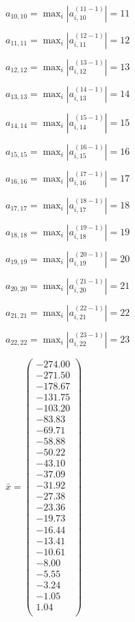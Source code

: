\documentclass[a4paper,12pt]{article}
\begin{document}
$a _{ 10, 10 } =  \max _i |a _{ i, 10 } ^{ (11 - 1) } | = 11$

$a _{ 11, 11 } =  \max _i |a _{ i, 11 } ^{ (12 - 1) } | = 12$

$a _{ 12, 12 } =  \max _i |a _{ i, 12 } ^{ (13 - 1) } | = 13$

$a _{ 13, 13 } =  \max _i |a _{ i, 13 } ^{ (14 - 1) } | = 14$

$a _{ 14, 14 } =  \max _i |a _{ i, 14 } ^{ (15 - 1) } | = 15$

$a _{ 15, 15 } =  \max _i |a _{ i, 15 } ^{ (16 - 1) } | = 16$

$a _{ 16, 16 } =  \max _i |a _{ i, 16 } ^{ (17 - 1) } | = 17$

$a _{ 17, 17 } =  \max _i |a _{ i, 17 } ^{ (18 - 1) } | = 18$

$a _{ 18, 18 } =  \max _i |a _{ i, 18 } ^{ (19 - 1) } | = 19$

$a _{ 19, 19 } =  \max _i |a _{ i, 19 } ^{ (20 - 1) } | = 20$

$a _{ 20, 20 } =  \max _i |a _{ i, 20 } ^{ (21 - 1) } | = 21$

$a _{ 21, 21 } =  \max _i |a _{ i, 21 } ^{ (22 - 1) } | = 22$

$a _{ 22, 22 } =  \max _i |a _{ i, 22 } ^{ (23 - 1) } | = 23$

$\bar { x } = \begin{pmatrix}
-274.00 \\
-271.50 \\
-178.67 \\
-131.75 \\
-103.20 \\
-83.83 \\
-69.71 \\
-58.88 \\
-50.22 \\
-43.10 \\
-37.09 \\
-31.92 \\
-27.38 \\
-23.36 \\
-19.73 \\
-16.44 \\
-13.41 \\
-10.61 \\
-8.00 \\
-5.55 \\
-3.24 \\
-1.05 \\
1.04 \\
\end{pmatrix}
$
\end{document}
